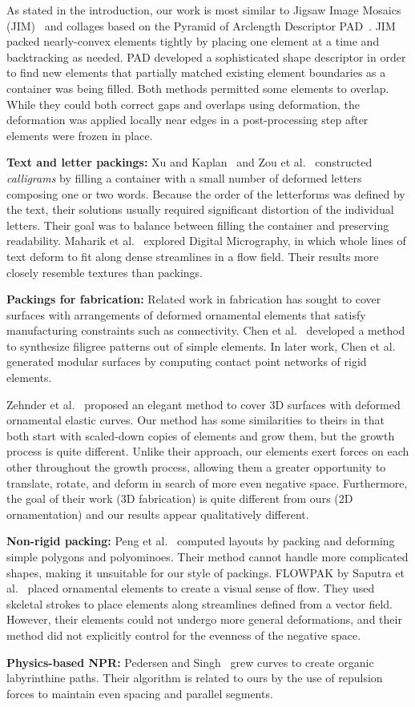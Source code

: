 As stated in the introduction, our work is most similar to Jigsaw
Image Mosaics (JIM)~\cite{Kim2002} and collages based on the Pyramid
of Arclength Descriptor PAD~\cite{Kwan2016}.  JIM packed
nearly-convex elements tightly by placing one element at a time and
backtracking as needed.  PAD developed a sophisticated shape
descriptor in order to find new elements that partially matched
existing element boundaries as a container was being filled.  Both
methods permitted some elements to overlap.  While they could
both correct gaps and overlaps using deformation, the deformation
was applied locally near edges in a post-processing step after
elements were frozen in place. 

\textbf{Text and letter packings:}
Xu and Kaplan~\cite{Xu2007} and Zou et al.~\cite{Zou2016}
constructed \textit{calligrams} by filling a container with a small
number of deformed letters composing one or two words.  Because the
order of the letterforms was defined by the text, their solutions
usually required significant distortion of the individual letters.
Their goal was to balance between filling the container and preserving
readability.  Maharik et al.~\cite{Maharik2011} explored Digital
Micrography, in which whole lines of text deform to fit along dense
streamlines in a flow field. Their results more closely resemble
textures than packings.

\textbf{Packings for fabrication:}
Related work in fabrication has sought to cover surfaces with
arrangements of deformed ornamental elements that satisfy manufacturing
constraints such as connectivity.  Chen et al.~\cite{Chen2016}
developed a method to synthesize filigree patterns out of simple
elements. 
In later work, Chen et al.~\cite{Chen2017}
generated modular surfaces by computing 
contact point networks of rigid elements.


Zehnder et al.~\cite{Zehnder2016} proposed an elegant method to
cover 3D surfaces with deformed ornamental elastic curves.
Our method has some similarities to theirs in that both start with 
scaled-down copies of elements and grow them, but the growth process is quite different.  
Unlike their approach, our elements exert
forces on each other throughout the growth process, allowing them a greater
opportunity to translate, rotate, and deform in search of more even negative
space.  Furthermore, the goal of their work (3D fabrication) is quite 
different from ours (2D ornamentation) and our results appear qualitatively
different.


\textbf{Non-rigid packing:}
Peng et al.~\cite{Peng2014} computed layouts by packing and deforming
simple polygons and polyominoes. Their method cannot handle more
complicated shapes, making it unsuitable for our style of packings.
FLOWPAK by Saputra et al.~\cite{Saputra2017} placed ornamental
elements to create a visual sense of flow. They used
skeletal strokes to place elements along streamlines defined from a
vector field.  However, their elements could not undergo more general
deformations, and their method did not explicitly control for the evenness
of the negative space.

\textbf{Physics-based NPR:} Pedersen and
Singh~\cite{Pedersen2006} grew curves to create organic
labyrinthine paths. Their algorithm is related to ours by the use
of repulsion forces to maintain even spacing and parallel segments.




